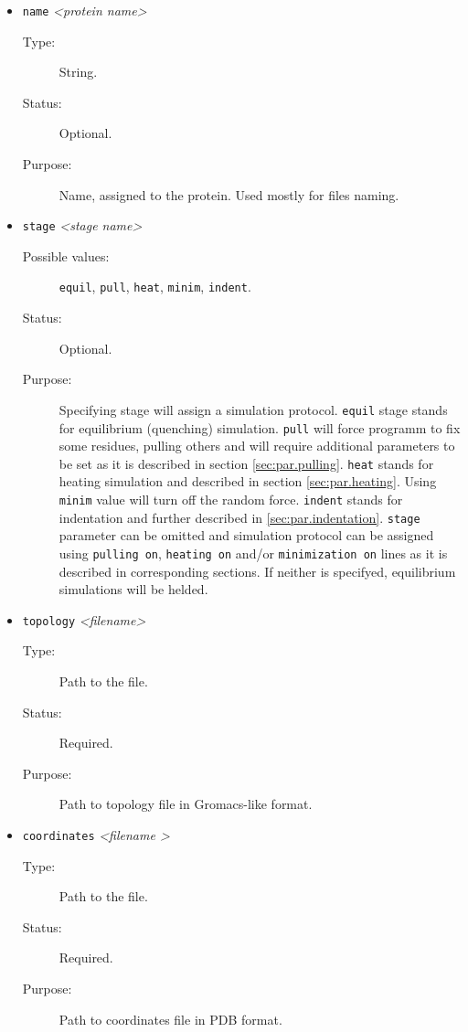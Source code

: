 \documentclass[a4paper]{article}
\begin{document}
\begin{itemize}

\item \texttt{name} \textit{\textless protein name\textgreater}
\begin{description}
\item[Type:] String.
\item[Status:] Optional.
\item[Purpose:] Name, assigned to the protein. Used mostly for files naming.
\end{description}

\item \texttt{stage} \textit{\textless stage name\textgreater}
\begin{description}
\item[Possible values:] \texttt{equil}, \texttt{pull}, \texttt{heat}, \texttt{minim}, \texttt{indent}.
\item[Status:] Optional.
\item[Purpose:] Specifying stage will assign a simulation protocol. \texttt{equil} stage stands for equilibrium (quenching) simulation. \texttt{pull} will force programm to fix some residues, pulling others and will require additional parameters to be set as it is described in section \ref{sec:par.pulling}. \texttt{heat} stands for heating simulation and described in section \ref{sec:par.heating}. Using \texttt{minim} value will turn off the random force. \texttt{indent} stands for indentation and further described in \ref{sec:par.indentation}. \texttt{stage} parameter can be omitted and simulation protocol can be assigned using \texttt{pulling on}, \texttt{heating on} and/or \texttt{minimization on} lines as it is described in corresponding sections. If neither is specifyed, equilibrium simulations will be helded.
\end{description}
   
\item \texttt{topology} \textit{\textless filename\textgreater}
\begin{description}
\item[Type:] Path to the file.
\item[Status:] Required.
\item[Purpose:] Path to topology file in Gromacs-like format.
\end{description}

\item \texttt{coordinates} \textit{\textless filename \textgreater}
\begin{description}
\item[Type:] Path to the file.
\item[Status:] Required.
\item[Purpose:] Path to coordinates file in PDB format.
\end{description}
   

\end{itemize}
\end{document}
